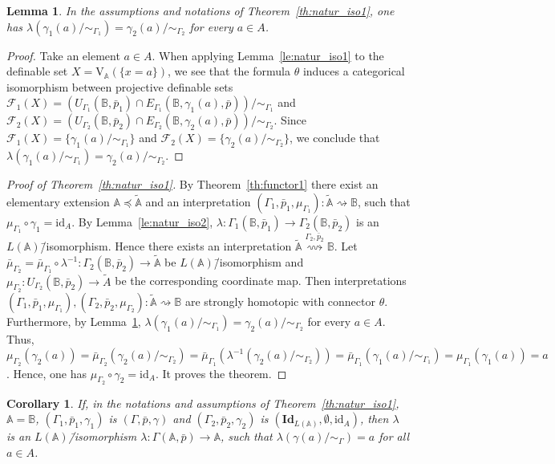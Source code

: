 \documentclass[12pt]{article}
\newtheorem{lemma}{Lemma}
\newtheorem{corollary}{Corollary}
\theoremstyle{definition}
\def\MA{{\mathbb{A}}}
\def\MB{{\mathbb{B}}}
\newcommand{\nsA}{\widetilde{\mathbb A}}
\newcommand{\nsuA}{\widetilde{A}}
\def\F{{\mathcal{F}}}
\def\id{{\mathrm{id}}}
\def\V{{\mathrm{V}}}
\def\Id{{\mathbf{Id}}}
\begin{document}
\begin{lemma}\label{le:natur_iso3}
In the assumptions and notations of Theorem~\ref{th:natur_iso1}, one has $\lambda(\gamma_1(a)/{\sim_{\Gamma_1}})=\gamma_2(a)/{\sim_{\Gamma_2}}$ for every $a\in A$.
\end{lemma}

\begin{proof}
Take an element $a\in A$. When applying  Lemma~\ref{le:natur_iso1} to the definable set $X=\V_\MA(\{x=a\})$, we see that the formula $\theta$ induces a categorical isomorphism between projective definable sets $\F_1(X)=(U_{\Gamma_1}(\MB,\bar p_1)\cap E_{\Gamma_1}(\MB,\gamma_1(a),\bar p))/{\sim_{\Gamma_1}}$ and $\F_2(X)=(U_{\Gamma_2}(\MB,\bar p_2)\cap E_{\Gamma_2}(\MB,\gamma_2(a),\bar p))/{\sim_{\Gamma_2}}$. Since $\F_1(X)=\{\gamma_1(a)/{\sim_{\Gamma_1}}\}$ and $\F_2(X)=\{\gamma_2(a)/{\sim_{\Gamma_2}}\}$, we conclude that  $\lambda(\gamma_1(a)/{\sim_{\Gamma_1}})=\gamma_2(a)/{\sim_{\Gamma_2}}$.
\end{proof}

\begin{proof}[Proof of Theorem~\ref{th:natur_iso1}]
By Theorem~\ref{th:functor1} there exist an elementary extension $\MA\preceq \nsA$ and an interpretation $(\Gamma_1,\bar p_1,\mu_{\Gamma_1})\colon \nsA\rightsquigarrow \MB$, such that $\mu_{\Gamma_1}\circ\gamma_1=\id_A$. By Lemma~\ref{le:natur_iso2},  $\lambda\colon\Gamma_1(\MB,\bar p_1)\to \Gamma_2(\MB,\bar p_2)$ is an $L(\MA)$\=/isomorphism. Hence there exists an interpretation $\nsA\stackrel{\Gamma_2,\bar p_2}{\rightsquigarrow}\MB$. Let $\bar \mu_{\Gamma_2}=\bar\mu_{\Gamma_1}\circ\lambda^{-1}\colon \Gamma_2(\MB,\bar p_2)\to \nsA$ be $L(\MA)$\=/isomorphism and $\mu_{\Gamma_2}\colon U_{\Gamma_2}(\MB,\bar p_2)\to \nsuA$ be the corresponding coordinate map. Then interpretations $(\Gamma_1,\bar p_1,\mu_{\Gamma_1}),(\Gamma_2,\bar p_2,\mu_{\Gamma_2})\colon \nsA\rightsquigarrow \MB$ are strongly homotopic with connector $\theta$. Furthermore, by Lemma~\ref{le:natur_iso3},  $\lambda(\gamma_1(a)/{\sim_{\Gamma_1}})=\gamma_2(a)/{\sim_{\Gamma_2}}$ for every $a\in A$. Thus, $\mu_{\Gamma_2}(\gamma_2(a))=\bar\mu_{\Gamma_2}(\gamma_2(a)/{\sim_{\Gamma_2}})=\bar\mu_{\Gamma_1}(\lambda^{-1}(\gamma_2(a)/{\sim_{\Gamma_2}}))=\bar\mu_{\Gamma_1}(\gamma_1(a)/{\sim_{\Gamma_1}})=\mu_{\Gamma_1}(\gamma_1(a))=a$. Hence, one has $\mu_{\Gamma_2}\circ\gamma_2=\id_A$. It proves the theorem.
\end{proof}

\begin{corollary}\label{cor:natur_iso0}
If, in the notations and assumptions of Theorem~\ref{th:natur_iso1}, $\MA=\MB$, $(\Gamma_1,\bar p_1,\gamma_1)$ is $(\Gamma,\bar p,\gamma)$ and $(\Gamma_2,\bar p_2,\gamma_2)$ is $(\Id_{L(\MA)},\emptyset,\id_A)$, then $\lambda$ is an $L(\MA)$\=/isomorphism $\lambda\colon \Gamma(\MA,\bar p)\to \MA$, such that $\lambda(\gamma(a)/{\sim_\Gamma})=a$ for all $a\in A$.
\end{corollary}
\end{document}
